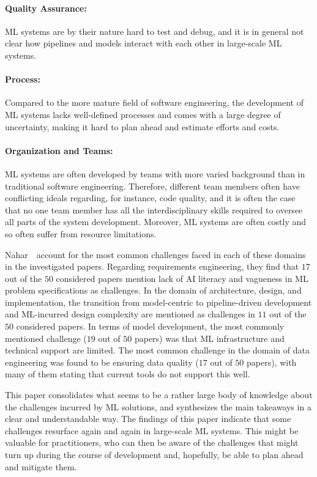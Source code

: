     \paragraph{Quality Assurance:} ML systems are by their nature hard to test and debug, and it is in general not clear how pipelines and models interact with each other in large-scale ML systems. 

    \paragraph{Process:} Compared to the more mature field of software engineering, the development of ML systems lacks well-defined processes and comes with a large degree of uncertainty, making it hard to plan ahead and estimate efforts and costs.

    \paragraph{Organization and Teams:} ML systems are often developed by teams with more varied background than in traditional software engineering. Therefore, different team members often have conflicting ideals regarding, for instance, code quality, and it is often the case that no one team member has all the interdisciplinary skills required to oversee all parts of the system development. Moreover, ML systems are often costly and so often suffer from resource limitations.

Nahar~\etal\ account for the most common challenges faced in each of these domains in the investigated papers. Regarding requirements engineering, they find that $17$ out of the $50$ considered papers mention lack of AI literacy and vagueness in ML problem specifications as challenges. In the domain of architecture, design, and implementation, the transition from model-centric to pipeline-driven development and ML-incurred design complexity are mentioned as challenges in $11$ out of the $50$ considered papers. In terms of model development, the most commonly mentioned challenge ($19$ out of $50$ papers) was that ML infrastructure and technical support are limited. The most common challenge in the domain of data engineering was found to be ensuring data quality ($17$ out of $50$ papers), with many of them stating that current tools do not support this well.  

This paper consolidates what seems to be a rather large body of knowledge about the challenges incurred by ML solutions, and synthesizes the main takeaways in a clear and understandable way. The findings of this paper indicate that some challenges resurface again and again in large-scale ML systems. This might be valuable for practitioners, who can then be aware of the challenges that might turn up during the course of development and, hopefully, be able to plan ahead and mitigate them. 

